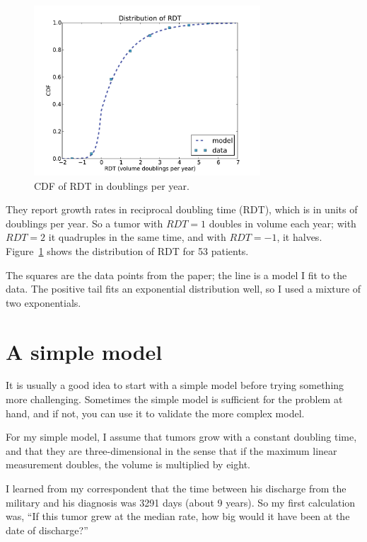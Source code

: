 \documentclass[12pt]{book}
\begin{document}
\begin{figure}
\centerline{\includegraphics[height=2.5in]{figs/kidney2.pdf}}
\caption{CDF of RDT in doublings per year.}
\label{fig.kidney2}
\end{figure}

They report growth rates in reciprocal doubling time (RDT),
which is in units of doublings per year.  So a tumor with $RDT=1$
doubles in volume each year; with $RDT=2$ it quadruples in the same
time, and with $RDT=-1$, it halves.  Figure~\ref{fig.kidney2} shows the
distribution of RDT for 53 patients.

The squares are the data points from the paper; the line is a model I
fit to the data.  The positive tail fits an exponential distribution
well, so I used a mixture of two exponentials.



\section{A simple model}

It is usually a good idea to start with a simple model before
trying something more challenging.  Sometimes the simple model is
sufficient for the problem at hand, and if not, you can use it
to validate the more complex model.

For my simple model, I assume that tumors grow with a constant
doubling time, and that they are three-dimensional in the sense that
if the maximum linear measurement doubles, the volume is multiplied by
eight.

I learned from my correspondent that the time between his discharge
from the military and his diagnosis was 3291 days (about 9 years).
So my first calculation was, ``If this tumor grew at the median
rate, how big would it have been at the date of discharge?''
\end{document}

